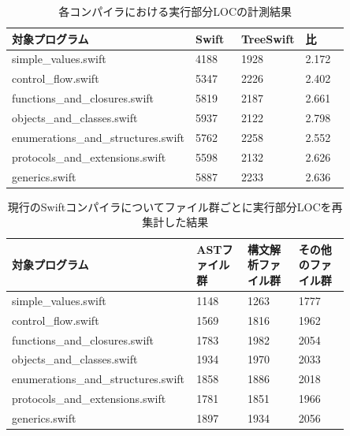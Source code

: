 \begin{table}[!hbtp]
    \begin{center}
        \caption{各コンパイラにおける実行部分LOCの計測結果}
        \begin{tabular}{|p{0.4\linewidth}|p{0.15\linewidth}|p{0.15\linewidth}|p{0.15\linewidth}|}
            \hline
            対象プログラム & Swift & TreeSwift & 比\\
            \hline
            \hline
            simple\_values.swift & 4188 & 1928 & 2.172\\
            \hline
            control\_flow.swift & 5347 & 2226 & 2.402\\
            \hline
            functions\_and\_closures.swift & 5819 & 2187 & 2.661\\
            \hline
            objects\_and\_classes.swift & 5937 & 2122 & 2.798\\
            \hline
            enumerations\_and\_structures.swift & 5762 & 2258 & 2.552\\
            \hline
            protocols\_and\_extensions.swift & 5598 & 2132 & 2.626\\
            \hline
            generics.swift & 5887 & 2233 & 2.636\\
            \hline
        \end{tabular}
        \label{table:loc-result}
    \end{center}
\end{table}

\begin{table}[!hbtp]
    \begin{center}
        \caption{現行のSwiftコンパイラについてファイル群ごとに実行部分LOCを再集計した結果}
        \begin{tabular}{|p{0.4\linewidth}|p{0.15\linewidth}|p{0.15\linewidth}|p{0.15\linewidth}|}
            \hline
            対象プログラム & ASTファイル群 & 構文解析ファイル群 & その他のファイル群\\
            \hline
            \hline
            simple\_values.swift & 1148 & 1263 & 1777\\
            \hline
            control\_flow.swift & 1569 & 1816 & 1962\\
            \hline
            functions\_and\_closures.swift & 1783 & 1982 & 2054\\
            \hline
            objects\_and\_classes.swift & 1934 & 1970 & 2033\\
            \hline
            enumerations\_and\_structures.swift & 1858 & 1886 & 2018\\
            \hline
            protocols\_and\_extensions.swift & 1781 & 1851 & 1966\\
            \hline
            generics.swift & 1897 & 1934 & 2056\\
            \hline
        \end{tabular}
        \label{table:loc-swift-per-file}
    \end{center}
\end{table}

